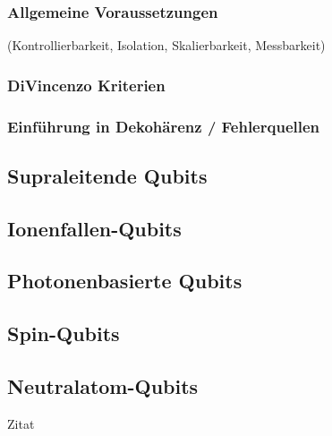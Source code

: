 \subsubsection{Allgemeine Voraussetzungen}
(Kontrollierbarkeit, Isolation, Skalierbarkeit, Messbarkeit) 
\subsubsection{DiVincenzo Kriterien}
\subsubsection{Einführung in Dekohärenz / Fehlerquellen}
\subsection{Supraleitende Qubits }
\subsection{Ionenfallen-Qubits }
\subsection{Photonenbasierte Qubits}
\subsection{Spin-Qubits}
\subsection{Neutralatom-Qubits }



Zitat \cite{alhazmi_live_2024}

\cite{bergou_quantum_2021}

\printbibliography
